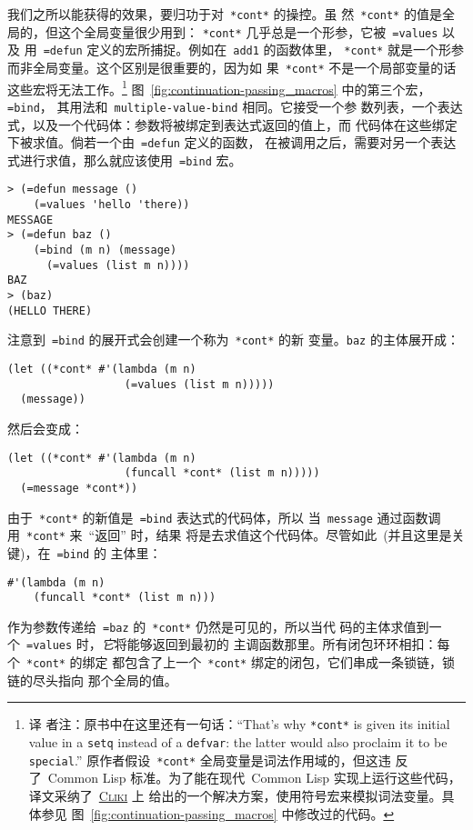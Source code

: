 我们之所以能获得\continuation{}的效果，要归功于对~\texttt{*cont*} 的操控。虽
然~\texttt{*cont*} 的值是全局的，但这个全局变量很少用到：
\texttt{*cont*} 几乎总是一个形参，它被~\texttt{=values} 以及
用~\texttt{=defun} 定义的宏所捕捉。例如在~\texttt{add1} 的函数体里，
\texttt{*cont*} 就是一个形参而非全局变量。这个区别是很重要的，因为如
果~\texttt{*cont*} 不是一个局部变量的话这些宏将无法工作。\footnote{译
  者注：原书中在这里还有一句话：``That's why \texttt{*cont*} is given
  its initial value in a \texttt{setq} instead of a \texttt{defvar}:
  the latter would also proclaim it to be \texttt{special}.'' 
  原作者假设~\texttt{*cont*} 全局变量是词法作用域的，但这违
  反了~Common Lisp 标准。为了能在现代~Common Lisp 实现上运行这些代码，
  译文采纳了~\href{http://www.cliki.net/On\%20Lisp}{\textsc{Cliki}} 上
  给出的一个解决方案，使用符号宏来模拟词法变量。具体参见
  图~\ref{fig:continuation-passing_macros} 中修改过的代码。}
图~\ref{fig:continuation-passing_macros} 中的第三个宏，\texttt{=bind}，
其用法和~\texttt{multiple-value-bind} 相同。它接受一个参
数列表，一个表达式，以及一个代码体：参数将被绑定到表达式返回的值上，而
代码体在这些绑定下被求值。倘若一个由~\texttt{=defun} 定义的函数，
在被调用之后，需要对另一个表达式进行求值，那么就应该使用~\texttt{=bind} 宏。
\begin{lstlisting}
> (=defun message ()
    (=values 'hello 'there))
MESSAGE
> (=defun baz ()
    (=bind (m n) (message)
      (=values (list m n))))
BAZ
> (baz)
(HELLO THERE)
\end{lstlisting}
注意到~\texttt{=bind} 的展开式会创建一个称为~\texttt{*cont*} 的新
变量。\texttt{baz} 的主体展开成：
\begin{lstlisting}
(let ((*cont* #'(lambda (m n)
                  (=values (list m n)))))
  (message))
\end{lstlisting}
然后会变成：
\begin{lstlisting}
(let ((*cont* #'(lambda (m n)
                  (funcall *cont* (list m n)))))
  (=message *cont*))
\end{lstlisting}
由于~\texttt{*cont*} 的新值是~\texttt{=bind} 表达式的代码体，所以
当~\texttt{message} 通过函数调用~\texttt{*cont*} 来~``返回'' 时，结果
将是去求值这个代码体。尽管如此~(并且这里是关键)，在~\texttt{=bind} 的
主体里：
\begin{lstlisting}
#'(lambda (m n)
    (funcall *cont* (list m n)))
\end{lstlisting}
作为参数传递给~\texttt{=baz} 的~\texttt{*cont*} 仍然是可见的，所以当代
码的主体求值到一个~\texttt{=values} 时，\emph{它}将能够返回到最初的
主调函数那里。所有闭包环环相扣：每个~\texttt{*cont*} 的绑定
都包含了上一个~\texttt{*cont*} 绑定的闭包，它们串成一条锁链，锁链的尽头指向
那个全局的值。


